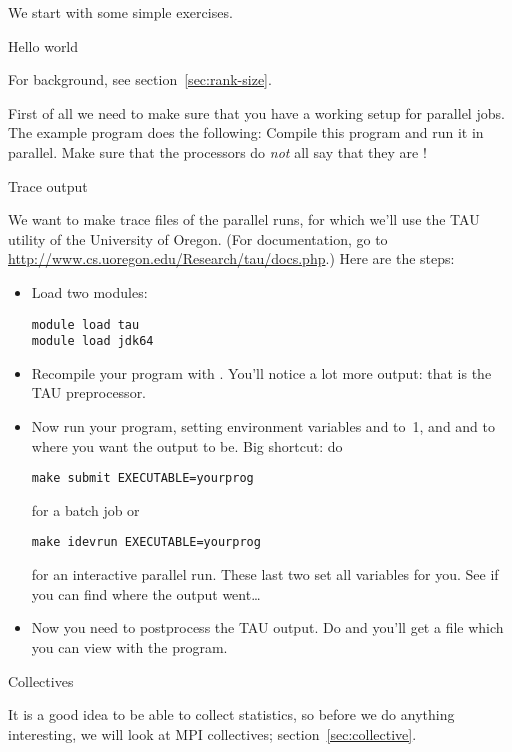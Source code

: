 We start with some simple exercises.

 {Hello world}

For background, see section~\ref{sec:rank-size}.

First of all we need to make sure that you have a working setup for
parallel jobs. The example program  does the
following:
Compile this program and run it in parallel. Make sure that the processors
do \emph{not} all say that they are !

\begin{istc}
   {Trace output}

  We want to make trace files of the parallel runs, for which we'll
  use the TAU utility of the University of Oregon. 
  (For documentation, go to \url{http://www.cs.uoregon.edu/Research/tau/docs.php}.)
  Here are the steps:
  \begin{itemize}
  \item Load two modules:
\begin{verbatim}
module load tau
module load jdk64
\end{verbatim}
  \item Recompile your program with . You'll notice a
    lot more output: that is the TAU preprocessor.
  \item Now run your program, setting environment variables
     and  to~1, and  and
     to where you want the output to be.  Big shortcut:
    do 
\begin{verbatim}
make submit EXECUTABLE=yourprog
\end{verbatim}
    for a batch job or 
\begin{verbatim}
make idevrun EXECUTABLE=yourprog
\end{verbatim}
    for an interactive parallel
    run. These last two set all variables for you. See if you can find
    where the output went\ldots
  \item Now you need to postprocess the TAU output. Do  and you'll get a file
     which you can view with the 
    program.
  \end{itemize}
\end{istc}

 {Collectives}

It is a good idea to be able to collect statistics, so before we do
anything interesting, we will look at MPI collectives;
section~\ref{sec:collective}.

